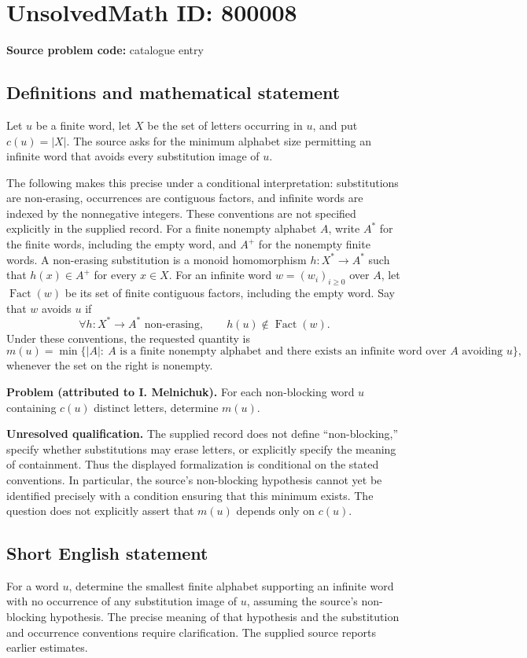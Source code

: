 \documentclass[11pt]{article}
\begin{document}
\section*{UnsolvedMath ID: 800008}
\textbf{Source problem code:} catalogue entry
\subsection{Definitions and mathematical statement}
Let \(u\) be a finite word, let \(X\) be the set of letters occurring in \(u\), and put \(c(u)=|X|\). The source asks for the minimum alphabet size permitting an infinite word that avoids every substitution image of \(u\).

The following makes this precise under a conditional interpretation: substitutions are non-erasing, occurrences are contiguous factors, and infinite words are indexed by the nonnegative integers. These conventions are not specified explicitly in the supplied record. For a finite nonempty alphabet \(A\), write \(A^*\) for the finite words, including the empty word, and \(A^+\) for the nonempty finite words. A non-erasing substitution is a monoid homomorphism \(h:X^*\to A^*\) such that \(h(x)\in A^+\) for every \(x\in X\). For an infinite word \(w=(w_i)_{i\geq 0}\) over \(A\), let \(\operatorname{Fact}(w)\) be its set of finite contiguous factors, including the empty word. Say that \(w\) avoids \(u\) if
\[
\forall h:X^*\to A^*\text{ non-erasing},\qquad h(u)\notin\operatorname{Fact}(w).
\]
Under these conventions, the requested quantity is
\[
m(u)=\min\bigl\{|A|:\ A\text{ is a finite nonempty alphabet and there exists an infinite word over }A\text{ avoiding }u\bigr\},
\]
whenever the set on the right is nonempty.

\textbf{Problem (attributed to I. Melnichuk).} For each non-blocking word \(u\) containing \(c(u)\) distinct letters, determine \(m(u)\).

\textbf{Unresolved qualification.} The supplied record does not define ``non-blocking,'' specify whether substitutions may erase letters, or explicitly specify the meaning of containment. Thus the displayed formalization is conditional on the stated conventions. In particular, the source's non-blocking hypothesis cannot yet be identified precisely with a condition ensuring that this minimum exists. The question does not explicitly assert that \(m(u)\) depends only on \(c(u)\).
\subsection{Short English statement}
For a word \(u\), determine the smallest finite alphabet supporting an infinite word with no occurrence of any substitution image of \(u\), assuming the source's non-blocking hypothesis. The precise meaning of that hypothesis and the substitution and occurrence conventions require clarification. The supplied source reports earlier estimates.
\end{document}
